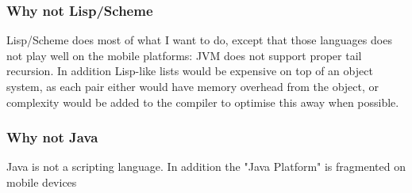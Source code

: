 \subsubsection{Why not Lisp/Scheme}
Lisp/Scheme does most of what I want to do, 
except that those languages does not play well on the mobile platforms:
JVM does not support proper tail recursion. 
In addition Lisp-like lists would be expensive on top of an object system, as each pair either would have memory overhead from the object, or complexity would be added to the compiler to optimise this away when possible.

\subsubsection{Why not Java}
Java is not a scripting language. In addition the "Java Platform" is fragmented on mobile devices
